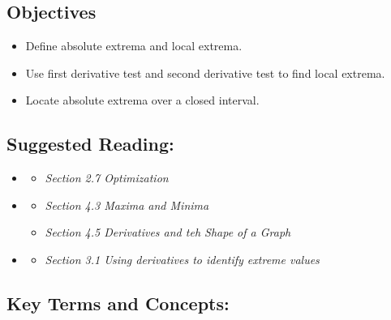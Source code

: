 \vspace{-0.25 in}
\begin{framed}
\subsection*{Objectives}
\begin{itemize}
    \item Define absolute extrema and local extrema.
    \item Use first derivative test and second derivative test to find local extrema.
    \item Locate absolute extrema over a closed interval.
\end{itemize}

\subsection*{Suggested Reading:}
\begin{itemize}
\item \cite{Calaway}\footnotemark[1]
   \begin{itemize}
        \item \emph{Section 2.7 Optimization}
    \end{itemize}
\item \cite{openstax}\footnotemark[2]
    \begin{itemize}
        \item \emph{Section 4.3  Maxima and Minima}
        \item \emph{Section 4.5 Derivatives and teh Shape of a Graph}
    \end{itemize}
\item \cite{activeCalc}\footnotemark[3]
    \begin{itemize}
        \item \emph{Section 3.1 Using derivatives to identify extreme values}
    \end{itemize}
\end{itemize}
\subsection*{Key Terms and Concepts:} 


\end{framed}
